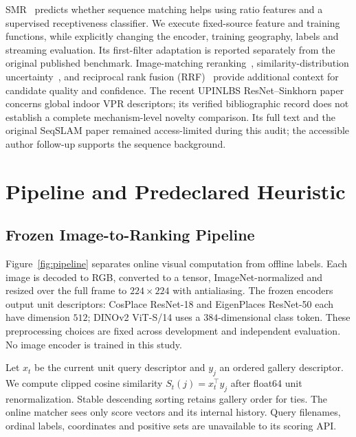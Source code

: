 \documentclass[conference]{IEEEtran}
\begin{document}
SMR~\cite{smr} predicts whether sequence matching helps using ratio features and a supervised receptiveness classifier. We execute fixed-source feature and training functions, while explicitly changing the encoder, training geography, labels and streaming evaluation. Its first-filter adaptation is reported separately from the original published benchmark. Image-matching reranking~\cite{match}, similarity-distribution uncertainty~\cite{doubt}, and reciprocal rank fusion (RRF)~\cite{rrf} provide additional context for candidate quality and confidence. The recent UPINLBS ResNet--Sinkhorn paper~\cite{sameconference} concerns global indoor VPR descriptors; its verified bibliographic record does not establish a complete mechanism-level novelty comparison. Its full text and the original SeqSLAM paper remained access-limited during this audit; the accessible author follow-up supports the sequence background.

\section{Pipeline and Predeclared Heuristic}
\subsection{Frozen Image-to-Ranking Pipeline}
Figure~\ref{fig:pipeline} separates online visual computation from offline labels. Each image is decoded to RGB, converted to a tensor, ImageNet-normalized and resized over the full frame to $224\times224$ with antialiasing. The frozen encoders output unit descriptors: CosPlace ResNet-18 and EigenPlaces ResNet-50 each have dimension $512$; DINOv2 ViT-S/14 uses a $384$-dimensional class token. These preprocessing choices are fixed across development and independent evaluation. No image encoder is trained in this study.

Let $x_t$ be the current unit query descriptor and $y_j$ an ordered gallery descriptor. We compute clipped cosine similarity $S_t(j)=x_t^\top y_j$ after float64 unit renormalization. Stable descending sorting retains gallery order for ties. The online matcher sees only score vectors and its internal history. Query filenames, ordinal labels, coordinates and positive sets are unavailable to its scoring API.
\end{document}

